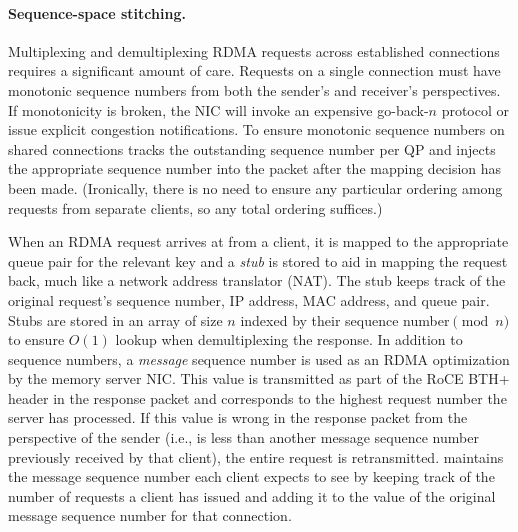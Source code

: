 \paragraph{Sequence-space stitching.}

Multiplexing and demultiplexing RDMA requests across established
connections requires a significant amount of care. Requests on a
single connection must have monotonic sequence numbers from both the
sender's and receiver's perspectives. If monotonicity is broken, the
NIC will invoke an expensive go-back-$n$ protocol or issue explicit
congestion notifications. To ensure monotonic sequence numbers on
shared connections {\sword} tracks the outstanding sequence number per QP and
injects the appropriate sequence number into the packet after the
mapping decision has been made.  (Ironically, there is no need to
ensure any particular ordering among requests from separate clients, so
any total ordering suffices.)

When an RDMA request arrives at {\sword} from a client, it is
mapped to the appropriate queue pair for the relevant key and a
\emph{stub} is stored to aid in mapping the request back, much like a
network address translator (NAT). The stub keeps track of the original
request's sequence number, IP address, MAC address, and queue
pair. Stubs are stored in an array of size $n$ indexed by their
sequence number$\pmod n$ to ensure $O(1)$ lookup when demultiplexing
the response.
In addition to sequence numbers, a \emph{message} sequence number
is used as an RDMA optimization by the memory server NIC. This value
is transmitted as part of the RoCE BTH+ header in the response packet
and corresponds to the highest request number the server has
processed. If this value is wrong in the response packet from the
perspective of the sender (i.e., is less than another message sequence
number previously received by that client), the entire request is
retransmitted.  {\sword} maintains the message sequence number each client
expects to see by keeping track of the number of requests a client has
issued and adding it to the value of the original message sequence
number for that connection.

